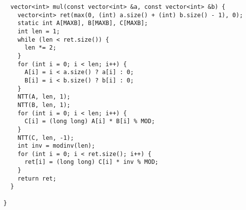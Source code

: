 \begin{lstlisting}
  vector<int> mul(const vector<int> &a, const vector<int> &b) {
    vector<int> ret(max(0, (int) a.size() + (int) b.size() - 1), 0);
    static int A[MAXB], B[MAXB], C[MAXB];
    int len = 1;
    while (len < ret.size()) {
      len *= 2;
    }
    for (int i = 0; i < len; i++) {
      A[i] = i < a.size() ? a[i] : 0;
      B[i] = i < b.size() ? b[i] : 0;
    }
    NTT(A, len, 1);
    NTT(B, len, 1);
    for (int i = 0; i < len; i++) {
      C[i] = (long long) A[i] * B[i] % MOD;
    }
    NTT(C, len, -1);
    int inv = modinv(len);
    for (int i = 0; i < ret.size(); i++) {
      ret[i] = (long long) C[i] * inv % MOD;
    }
    return ret;
  }

}


\end{lstlisting}